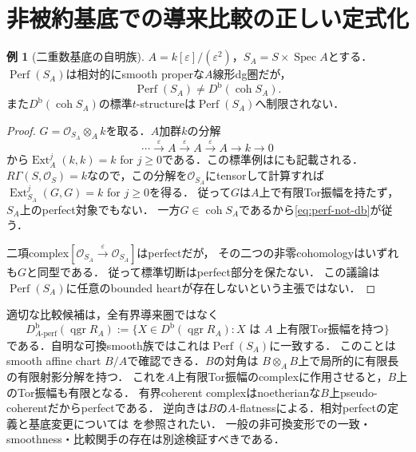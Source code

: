 \documentclass[11pt,a4paper]{ltjsarticle}
\theoremstyle{definition}
\newtheorem{example}[theorem]{例}
\newcommand{\OO}{\mathcal O}
\newcommand{\Ext}{\operatorname{Ext}}
\newcommand{\qgr}{\operatorname{qgr}}
\newcommand{\coh}{\operatorname{coh}}
\newcommand{\Perf}{\operatorname{Perf}}
\newcommand{\Db}{D^{\mathrm b}}
\begin{document}
\section{非被約基底での導来比較の正しい定式化}\label{sec:perfect-warning}
\begin{example}[二重数基底の自明族]\label{ex:dual-numbers}
$A=k[\varepsilon]/(\varepsilon^2)$，$S_A=S\times\operatorname{Spec}A$とする．
$\Perf(S_A)$は相対的にsmooth properな$A$線形dg圏だが，
\begin{equation}\label{eq:perf-not-db}
 \Perf(S_A)\ne\Db(\coh S_A).
\end{equation}
また$\Db(\coh S_A)$の標準$t$-structureは$\Perf(S_A)$へ制限されない．
\end{example}
\begin{proof}
$G=\OO_{S_A}\otimes_A k$を取る．$A$加群$k$の分解
\[
 \cdots\xrightarrow{\varepsilon}A\xrightarrow{\varepsilon}A
 \xrightarrow{\varepsilon}A\longrightarrow k\longrightarrow0
\]
から$\Ext_A^j(k,k)=k$ for $j\geq0$である．この標準例は\cite[Tag 0A5Q]{Stacks}にも記載される．
$R\Gamma(S,\OO_S)=k$なので，この分解を$\OO_{S_A}$にtensorして計算すれば
$\Ext_{S_A}^j(G,G)=k$ for $j\geq0$を得る．
従って$G$は$A$上で有限Tor振幅を持たず，$S_A$上のperfect対象でもない．
一方$G\in\coh S_A$であるから\eqref{eq:perf-not-db}が従う．

二項complex$[\OO_{S_A}\xrightarrow{\varepsilon}\OO_{S_A}]$はperfectだが，
その二つの非零cohomologyはいずれも$G$と同型である．
従って標準切断はperfect部分を保たない．
この議論は$\Perf(S_A)$に任意のbounded heartが存在しないという主張ではない．
\end{proof}

適切な比較候補は，全有界導来圏ではなく
\[
 \Db_{A\text{-}\mathrm{perf}}(\qgr R_A)
 :=\{X\in\Db(\qgr R_A):X\text{ は }A\text{ 上有限Tor振幅を持つ}\}
\]
である．自明な可換smooth族ではこれは$\Perf(S_A)$に一致する．
このことはsmooth affine chart $B/A$で確認できる．$B$の対角は
$B\otimes_A B$上で局所的に有限長の有限射影分解を持つ．
これを$A$上有限Tor振幅のcomplexに作用させると，$B$上のTor振幅も有限となる．
有界coherent complexはnoetherianな$B$上pseudo-coherentだからperfectである．
逆向きは$B$の$A$-flatnessによる．相対perfectの定義と基底変更については
\cite[Tag 0DHZ]{Stacks}を参照されたい．
一般の非可換変形での一致・smoothness・比較関手の存在は別途検証すべきである．
\end{document}
